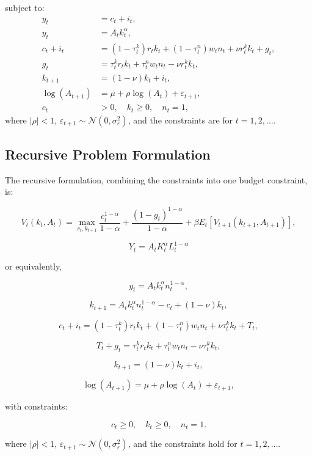 \documentclass{article}
\begin{document}
subject to:
\begin{align}
    y_t &= c_t + i_t, \\
    y_t &= A_t k_t^\alpha, \\
    c_t + i_t &= \left( 1 - \tau_t^k \right) r_t k_t + \left( 1 - \tau_t^n \right) w_t n_t + \nu r_t^k k_t + g_t, \\
    g_t &= \tau_t^k r_t k_t + \tau_t^n w_t n_t - \nu r_t^k k_t, \\
    k_{t+1} &= (1 - \nu) k_t + i_t, \\
    \log(A_{t+1}) &= \mu + \rho \log(A_t) + \varepsilon_{t+1}, \\
    c_t &> 0, \quad k_t \geq 0, \quad n_t = 1,
\end{align}
where \( |\rho| < 1 \), \( \varepsilon_{t+1} \sim \mathcal{N}(0, \sigma_\varepsilon^2) \), and the constraints are for \( t = 1,2,\dots \).

\subsection*{Recursive Problem Formulation}

The recursive formulation, combining the constraints into one budget constraint, is:

\[
V_t(k_t, A_t) = \max_{c_t, k_{t+1}} \frac{c_t^{1-\alpha}}{1-\alpha} + \frac{(1 - g_t)^{1-\alpha}}{1-\alpha} + \beta E_t \left[ V_{t+1}(k_{t+1}, A_{t+1}) \right],
\]


\[
Y_t = A_t K_t^{\alpha} L_t^{1-\alpha}
\]

or equivalently,

\[
y_t = A_t k_t^\alpha n_t^{1-\alpha},
\]

\[
k_{t+1} = A_t k_t^\alpha n_t^{1-\alpha} - c_t + (1-\nu)k_t,
\]

\[
c_t + i_t = \left(1 - \tau^k_t \right) r_t k_t + \left(1 - \tau^n_t \right) w_t n_t + \nu \tau^k_t k_t + T_t,
\]

\[
T_t + g_t = \tau^k_t r_t k_t + \tau^n_t w_t n_t - \nu \tau^k_t k_t,
\]

\[
k_{t+1} = (1-\nu)k_t + i_t,
\]

\[
\log(A_{t+1}) = \mu + \rho \log(A_t) + \varepsilon_{t+1},
\]

with constraints:

\[
c_t \geq 0, \quad k_t \geq 0, \quad n_t = 1.
\]

where \( |\rho| < 1 \), \( \varepsilon_{t+1} \sim \mathcal{N}(0, \sigma^2_\varepsilon) \), and the constraints hold for \( t = 1, 2, \dots \).
\end{document}
